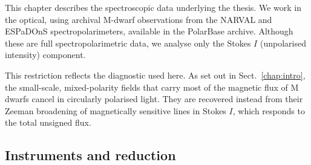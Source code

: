 
This chapter describes the spectroscopic data underlying the thesis. We work in the optical, using archival M-dwarf observations from the NARVAL and ESPaDOnS spectropolarimeters, available in the PolarBase archive. Although these are full spectropolarimetric data, we analyse only the Stokes $I$ (unpolarised intensity) component.

This restriction reflects the diagnostic used here. As set out in Sect.~\ref{chap:intro}, the small-scale, mixed-polarity fields that carry most of the magnetic flux of M dwarfs cancel in circularly polarised light. They are recovered instead from their Zeeman broadening of magnetically sensitive lines in Stokes $I$, which responds to the total unsigned flux.

\subsection{Instruments and reduction}
\label{sec:obs_instruments}



